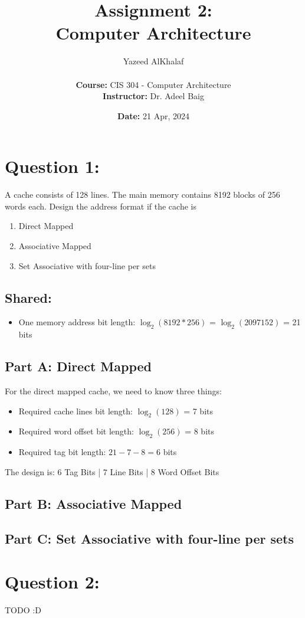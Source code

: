 \documentclass[a4paper]{article}
\title{\textbf{Assignment 2:\\Computer Architecture}}
\author{
    Yazeed AlKhalaf\\
    \\
    \textbf{Course:} CIS 304 - Computer Architecture\\
    \textbf{Instructor:} Dr. Adeel Baig
}
\date{\textbf{Date:} 21 Apr, 2024}
\begin{document}
\maketitle

\newpage

\tableofcontents

\newpage

\section{Question 1:}

A cache consists of 128 lines. The main memory contains 8192 blocks of 256
words each. Design the address format if the cache is

\begin{enumerate}[label=(\alph*)]
    \item Direct Mapped
    \item Associative Mapped
    \item Set Associative with four-line per sets
\end{enumerate}

\subsection{Shared:}

\begin{itemize}
    \item One memory address bit length: $\log_2(8192*256)$ = $\log_2(2097152)$ = 21 bits
\end{itemize}

\subsection{Part A: Direct Mapped}

For the direct mapped cache, we need to know three things:

\begin{itemize}
    \item Required cache lines bit length: $\log_2(128)$ = 7 bits
    \item Required word offset bit length: $\log_2(256)$ = 8 bits
    \item Required tag bit length: $21 - 7 - 8 = 6$ bits
\end{itemize}

The design is: 6 Tag Bits | 7 Line Bits | 8 Word Offset Bits

\subsection{Part B: Associative Mapped}

\subsection{Part C: Set Associative with four-line per sets}

\section{Question 2:}

TODO :D
\end{document}
